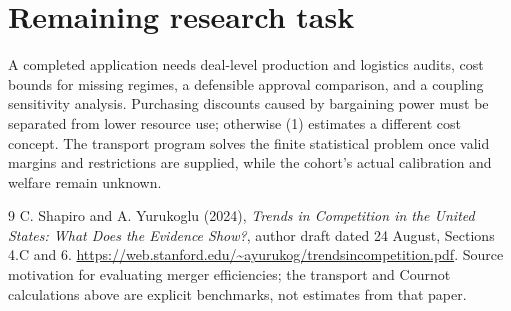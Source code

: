 \documentclass[11pt,a4paper]{article}
\begin{document}
\section{Remaining research task}
A completed application needs deal-level production and logistics audits, cost bounds for missing regimes, a defensible approval comparison, and a coupling sensitivity analysis. Purchasing discounts caused by bargaining power must be separated from lower resource use; otherwise (1) estimates a different cost concept. The transport program solves the finite statistical problem once valid margins and restrictions are supplied, while the cohort's actual calibration and welfare remain unknown.
\begin{thebibliography}{9}
 C. Shapiro and A. Yurukoglu (2024), \emph{Trends in Competition in the United States: What Does the Evidence Show?}, author draft dated 24 August, Sections 4.C and 6. \url{https://web.stanford.edu/~ayurukog/trendsincompetition.pdf}. Source motivation for evaluating merger efficiencies; the transport and Cournot calculations above are explicit benchmarks, not estimates from that paper.
\end{thebibliography}
\end{document}
